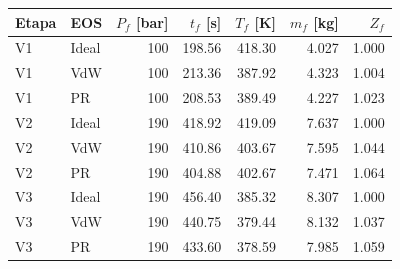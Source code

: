 \begin{tabular}{llrrrrr}
\toprule
Etapa & EOS & $P_f$ [bar] & $t_f$ [s] & $T_f$ [K] & $m_f$ [kg] & $Z_f$ \\
\midrule
V1 & Ideal & 100 & 198.56 & 418.30 & 4.027 & 1.000 \\
V1 & VdW & 100 & 213.36 & 387.92 & 4.323 & 1.004 \\
V1 & PR & 100 & 208.53 & 389.49 & 4.227 & 1.023 \\
V2 & Ideal & 190 & 418.92 & 419.09 & 7.637 & 1.000 \\
V2 & VdW & 190 & 410.86 & 403.67 & 7.595 & 1.044 \\
V2 & PR & 190 & 404.88 & 402.67 & 7.471 & 1.064 \\
V3 & Ideal & 190 & 456.40 & 385.32 & 8.307 & 1.000 \\
V3 & VdW & 190 & 440.75 & 379.44 & 8.132 & 1.037 \\
V3 & PR & 190 & 433.60 & 378.59 & 7.985 & 1.059 \\
\bottomrule
\end{tabular}
